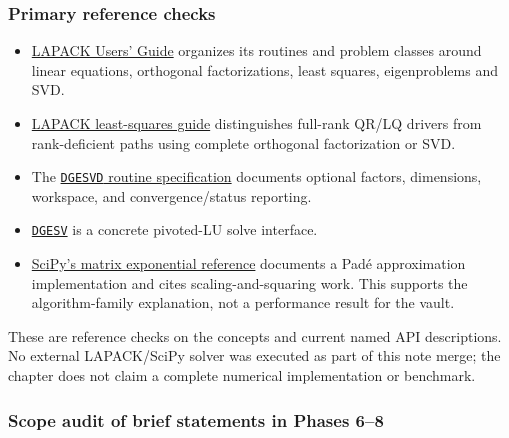 \subsubsection{Primary reference checks}\label{appendix-a103e7846d21-primary-reference-checks}

\begin{itemize}
\tightlist
\item
  \href{https://netlib.org/lapack/lug/index.html}{LAPACK Users' Guide} organizes its routines and problem classes around linear equations, orthogonal factorizations, least squares, eigenproblems and SVD.
\item
  \href{https://www.netlib.org/lapack/lug/node27.html}{LAPACK least-squares guide} distinguishes full-rank QR/LQ drivers from rank-deficient paths using complete orthogonal factorization or SVD.
\item
  The \href{https://netlib.org/lapack/explore-html/d1/d7f/group__gesvd_gac6bd5d4e645049e49bb70691180abf07.html}{\texttt{DGESVD} routine specification} documents optional factors, dimensions, workspace, and convergence/status reporting.
\item
  \href{https://netlib.org/lapack/explore-html/d8/da6/group__gesv_ga831ce6a40e7fd16295752d18aed2d541.html}{\texttt{DGESV}} is a concrete pivoted-LU solve interface.
\item
  \href{https://docs.scipy.org/doc/scipy/reference/generated/scipy.sparse.linalg.expm.html}{SciPy's matrix exponential reference} documents a Padé approximation implementation and cites scaling-and-squaring work. This supports the algorithm-family explanation, not a performance result for the vault.
\end{itemize}

These are reference checks on the concepts and current named API descriptions. No external LAPACK/SciPy solver was executed as part of this note merge; the chapter does not claim a complete numerical implementation or benchmark.

\subsubsection{Scope audit of brief statements in Phases 6--8}\label{appendix-a103e7846d21-scope-audit-of-brief-statements-in-phases-68}

